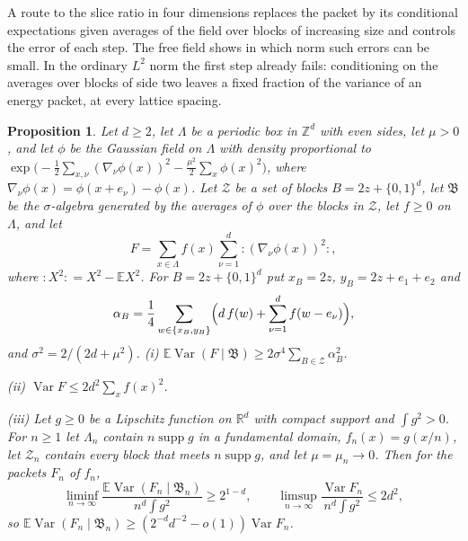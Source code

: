\documentclass[aps,prd,twocolumn,superscriptaddress,nofootinbib,longbibliography,floatfix,amsmath,amssymb,10pt]{revtex4-2}
\newtheorem{proposition}[theorem]{Proposition}
\theoremstyle{definition}
\theoremstyle{remark}
\newcommand{\R}{\mathbb{R}}
\newcommand{\Z}{\mathbb{Z}}
\newcommand{\E}{\mathbb{E}}
\newcommand{\Var}{\operatorname{Var}}
\begin{document}
A route to the slice ratio in four dimensions replaces the packet by its
conditional expectations given averages of the field over blocks of
increasing size and controls the error of each step. The free field shows in
which norm such errors can be small. In the ordinary $L^2$ norm the first
step already fails: conditioning on the averages over blocks of side two
leaves a fixed fraction of the variance of an energy packet, at every
lattice spacing.

\begin{proposition}\label{prop:blockfree}
Let $d\ge2$, let $\Lambda$ be a periodic box in $\Z^d$ with even sides, let
$\mu>0$, and let $\phi$ be the Gaussian field on $\Lambda$ with density
proportional to
$\exp\bigl(-\frac12\sum_{x,\nu}(\nabla_\nu\phi(x))^2-\frac{\mu^2}2\sum_x
\phi(x)^2\bigr)$, where $\nabla_\nu\phi(x)=\phi(x+e_\nu)-\phi(x)$. Let
$\mathcal Z$ be a set of blocks $B=2z+\{0,1\}^d$, let $\mathfrak B$ be the
$\sigma$-algebra generated by the averages of $\phi$ over the blocks in
$\mathcal Z$, let $f\ge0$ on $\Lambda$, and let
\[
F=\sum_{x\in\Lambda}f(x)\sum_{\nu=1}^d{:}(\nabla_\nu\phi(x))^2{:} ,
\]
where ${:}X^2{:}=X^2-\E X^2$. For $B=2z+\{0,1\}^d$ put $x_B=2z$,
$y_B=2z+e_1+e_2$ and
\[
\alpha_B=\frac14\sum_{w\in\{x_B,y_B\}}\Bigl(d\,f(w)+\sum_{\nu=1}^df(w-e_\nu)
\Bigr),
\]
and $\sigma^2=2/(2d+\mu^2)$.
\textup{(i)} $\E\Var(F\mid\mathfrak B)\ge2\sigma^4\sum_{B\in\mathcal Z}\alpha_B^2$.

\textup{(ii)} $\Var F\le2d^2\sum_xf(x)^2$.

\textup{(iii)} Let $g\ge0$ be a Lipschitz function on $\R^d$ with compact
support and $\int g^2>0$. For $n\ge1$ let $\Lambda_n$ contain $n\operatorname{supp}g$
in a fundamental domain, $f_n(x)=g(x/n)$, let $\mathcal Z_n$ contain every
block that meets $n\operatorname{supp}g$, and let $\mu=\mu_n\to0$. Then for
the packets $F_n$ of $f_n$,
\[
\liminf_{n\to\infty}\frac{\E\Var(F_n\mid\mathfrak B_n)}{n^d\int g^2}
\ge2^{1-d},\qquad
\limsup_{n\to\infty}\frac{\Var F_n}{n^d\int g^2}\le2d^2 ,
\]
so $\E\Var(F_n\mid\mathfrak B_n)\ge(2^{-d}d^{-2}-o(1))\Var F_n$.
\end{proposition}
\end{document}
